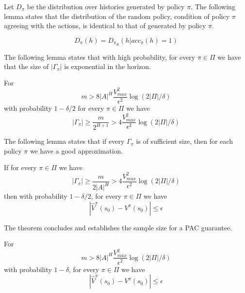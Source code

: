 Let $D_\pi$ be the distribution over histories generated by policy
$\pi$. The following lemma states that the distribution of the
random policy, condition of policy $\pi$ agreeing with the actions,
is identical to that of generated by policy $\pi$.
\begin{lemma}
\[
D_\pi(h)=D_{\pi_R}(h|acc_\pi(h)=1)
\]
\end{lemma}

The following lemma states that with high probability, for every
$\pi\in \Pi$ we have that the size of $|\Gamma_\pi|$ is exponential
in the horizon.
\begin{lemma}
For
\[
m> 8|A|^{H}\frac{V^2_{max}}{\epsilon^2}\log(2|\Pi|/\delta)
\]
with probability $1-\delta/2$ for every $\pi\in \Pi$ we have
\[
|\Gamma_\pi|\geq \frac{m}{2^{H+1}}>
4\frac{V^2_{max}}{\epsilon^2}\log(2|\Pi|/\delta)
\]
\end{lemma}

The following lemma states that if every $\Gamma_\pi$ is of
sufficient size, then for each policy $\pi$ we have a good
approximation.
\begin{lemma}
If for every $\pi\in \Pi$ we have
\[
|\Gamma_\pi|\geq \frac{m}{2|A|^{H}}> 4
\frac{V^2_{max}}{\epsilon^2}\log(2|\Pi|/\delta)
\]
then with probability $1-\delta/2$, for every $\pi\in \Pi$ we have
\[
|\hat{V}^\pi (s_0)-V^\pi(s_0)|\leq \epsilon
\]
\end{lemma}


The theorem concludes and establishes the sample size for a PAC
guarantee.
\begin{theorem}
For
\[
m> 8|A|^{H}\frac{V^2_{max}}{\epsilon^2}\log(2|\Pi|/\delta)
\]
with probability $1-\delta$, for every $\pi\in \Pi$ we have
\[
|\hat{V}^\pi (s_0)-V^\pi(s_0)|\leq \epsilon
\]
\end{theorem}



















%
